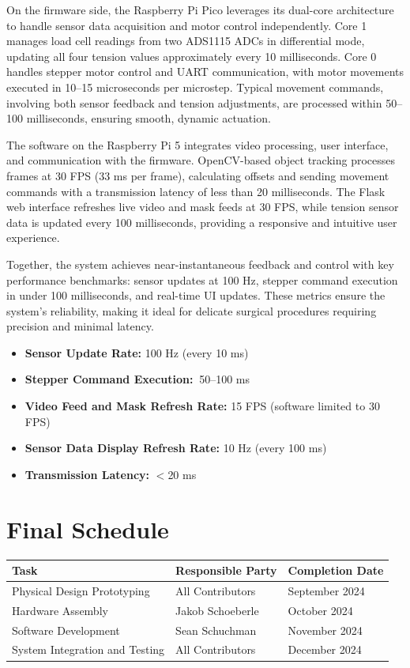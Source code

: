 On the firmware side, the Raspberry Pi Pico leverages its dual-core architecture to handle sensor data acquisition and motor control independently. Core 1 manages load cell readings from two ADS1115 ADCs in differential mode, updating all four tension values approximately every 10 milliseconds. Core 0 handles stepper motor control and UART communication, with motor movements executed in 10–15 microseconds per microstep. Typical movement commands, involving both sensor feedback and tension adjustments, are processed within 50–100 milliseconds, ensuring smooth, dynamic actuation.

The software on the Raspberry Pi 5 integrates video processing, user interface, and communication with the firmware. OpenCV-based object tracking processes frames at 30 FPS (33 ms per frame), calculating offsets and sending movement commands with a transmission latency of less than 20 milliseconds. The Flask web interface refreshes live video and mask feeds at 30 FPS, while tension sensor data is updated every 100 milliseconds, providing a responsive and intuitive user experience.

Together, the system achieves near-instantaneous feedback and control with key performance benchmarks: sensor updates at 100 Hz, stepper command execution in under 100 milliseconds, and real-time UI updates. These metrics ensure the system's reliability, making it ideal for delicate surgical procedures requiring precision and minimal latency.

\begin{itemize}
    \item \textbf{Sensor Update Rate:} 100 Hz (every 10 ms)
    \item \textbf{Stepper Command Execution:} $~$50–100 ms
    \item \textbf{Video Feed and Mask Refresh Rate:} 15 FPS (software limited to 30 FPS)
    \item \textbf{Sensor Data Display Refresh Rate:} 10 Hz (every 100 ms)
    \item \textbf{Transmission Latency:} $<$20 ms
\end{itemize}

\section{Final Schedule}
\begin{tabular}{|l|l|l|}
    \hline
    Task & Responsible Party & Completion Date \\ \hline
    Physical Design Prototyping & All Contributors & September 2024 \\ \hline
    Hardware Assembly & Jakob Schoeberle & October 2024 \\ \hline
    Software Development & Sean Schuchman & November 2024 \\ \hline
    System Integration and Testing & All Contributors & December 2024 \\ \hline
\end{tabular}

